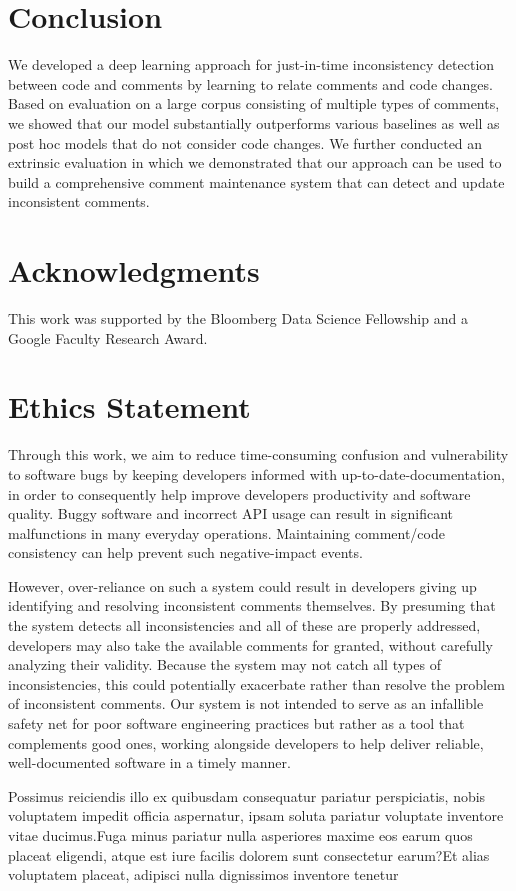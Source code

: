 \documentclass[letterpaper]{article} %
\newcommand{\Posthoc}{post hoc}
\newcommand{\JustInTime}{just-in-time}
\begin{document}
\section{Conclusion}
We developed a deep learning approach for \JustInTime{} inconsistency detection between code and comments by learning to relate comments and code changes. Based on evaluation on a large corpus consisting of multiple types of comments, we showed that our model substantially  outperforms various baselines as well as \Posthoc{} models that do not consider code changes. We further conducted an extrinsic evaluation in which we demonstrated that our approach can be used to build a comprehensive comment maintenance system that can detect and update inconsistent comments.


\vspace{-0.78mm}
\section*{Acknowledgments}
This work was supported by the Bloomberg Data Science Fellowship and a Google Faculty Research Award.


\section*{Ethics Statement}
Through this work, we aim to reduce time-consuming confusion and vulnerability to software bugs by keeping developers informed with up-to-date-documentation, in order to consequently help improve developers productivity and software quality. Buggy software and incorrect API usage can result in significant malfunctions in many everyday operations. Maintaining comment/code consistency can help prevent such negative-impact events.

However, over-reliance on such a system could result in developers giving up identifying and resolving inconsistent comments themselves. By presuming that the system detects all inconsistencies and all of these are properly addressed, developers may also take the available comments for granted, without carefully analyzing their validity. Because the system may not catch all types of inconsistencies, this could potentially exacerbate rather than resolve the problem of inconsistent comments. Our system is not intended to serve as an infallible safety net for poor software engineering practices but rather as a tool that complements good ones, working alongside developers to help deliver reliable, well-documented software in a timely manner.



\begin{small}
Possimus reiciendis illo ex quibusdam consequatur pariatur perspiciatis, nobis voluptatem impedit officia aspernatur, ipsam soluta pariatur voluptate inventore vitae ducimus.Fuga minus pariatur nulla asperiores maxime eos earum quos placeat eligendi, atque est iure facilis dolorem sunt consectetur earum?Et alias voluptatem placeat, adipisci nulla dignissimos inventore tenetur

\end{small}
\end{document}
